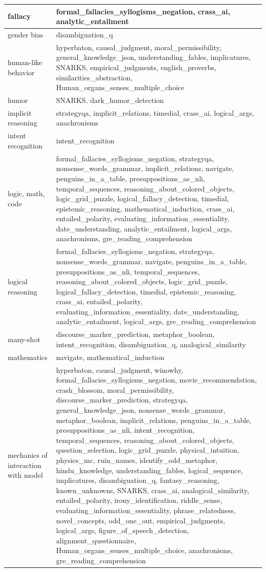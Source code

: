 \documentclass[11pt, a4paper, logo, internal, copyright, nonumbering]{deepmind}
\begin{document}
\begin{xltabular}{\textwidth}{X|X}
fallacy & formal\_fallacies\_syllogisms\_negation, crass\_ai, analytic\_entailment \\ \hline
gender bias & disambiguation\_q \\ \hline
human-like behavior & hyperbaton, causal\_judgment, moral\_permissibility, general\_knowledge\_json, understanding\_fables, implicatures, SNARKS, empirical\_judgments, english\_proverbs, similarities\_abstraction, Human\_organs\_senses\_multiple\_choice \\ \hline
humor & SNARKS, dark\_humor\_detection \\ \hline
implicit reasoning & strategyqa, implicit\_relations, timedial, crass\_ai, logical\_args, anachronisms \\ \hline
intent recognition & intent\_recognition \\ \hline
logic, math, code & formal\_fallacies\_syllogisms\_negation, strategyqa, nonsense\_words\_grammar, implicit\_relations, navigate, penguins\_in\_a\_table, presuppositions\_as\_nli, temporal\_sequences, reasoning\_about\_colored\_objects, logic\_grid\_puzzle, logical\_fallacy\_detection, timedial, epistemic\_reasoning, mathematical\_induction, crass\_ai, entailed\_polarity, evaluating\_information\_essentiality, date\_understanding, analytic\_entailment, logical\_args, anachronisms, gre\_reading\_comprehension \\ \hline
logical reasoning & formal\_fallacies\_syllogisms\_negation, strategyqa, nonsense\_words\_grammar, navigate, penguins\_in\_a\_table, presuppositions\_as\_nli, temporal\_sequences, reasoning\_about\_colored\_objects, logic\_grid\_puzzle, logical\_fallacy\_detection, timedial, epistemic\_reasoning, crass\_ai, entailed\_polarity, evaluating\_information\_essentiality, date\_understanding, analytic\_entailment, logical\_args, gre\_reading\_comprehension \\ \hline
many-shot & discourse\_marker\_prediction, metaphor\_boolean, intent\_recognition, disambiguation\_q, analogical\_similarity \\ \hline
mathematics & navigate, mathematical\_induction \\ \hline
mechanics of interaction with model & hyperbaton, causal\_judgment, winowhy, formal\_fallacies\_syllogisms\_negation, movie\_recommendation, crash\_blossom, moral\_permissibility, discourse\_marker\_prediction, strategyqa, general\_knowledge\_json, nonsense\_words\_grammar, metaphor\_boolean, implicit\_relations, penguins\_in\_a\_table, presuppositions\_as\_nli, intent\_recognition, temporal\_sequences, reasoning\_about\_colored\_objects, question\_selection, logic\_grid\_puzzle, physical\_intuition, physics\_mc, ruin\_names, identify\_odd\_metaphor, hindu\_knowledge, understanding\_fables, logical\_sequence, implicatures, disambiguation\_q, fantasy\_reasoning, known\_unknowns, SNARKS, crass\_ai, analogical\_similarity, entailed\_polarity, irony\_identification, riddle\_sense, evaluating\_information\_essentiality, phrase\_relatedness, novel\_concepts, odd\_one\_out, empirical\_judgments, logical\_args, figure\_of\_speech\_detection, alignment\_questionnaire, Human\_organs\_senses\_multiple\_choice, anachronisms, gre\_reading\_comprehension \\ \hline

\end{xltabular}
\end{document}
